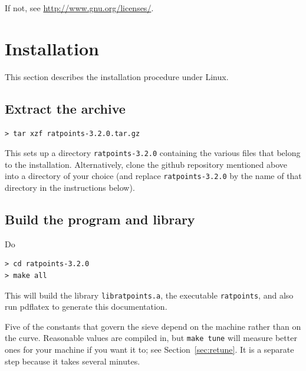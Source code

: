 \documentclass[12pt,a4paper,oneside]{amsart}
\newcommand{\rpversion}{3.2.0} %
\begin{document}
If not, see \url{http://www.gnu.org/licenses/}.


\section{Installation}

This section describes the installation procedure under Linux.

\subsection{Extract the archive}

\begin{verbatim}
> tar xzf ratpoints-3.2.0.tar.gz
\end{verbatim}

This sets up a directory \texttt{ratpoints-\rpversion} containing the various
files that belong to the installation. Alternatively, clone the github
repository mentioned above into a directory of your choice (and replace
\texttt{ratpoints-\rpversion} by the name of that directory in the instructions below).

\subsection{Build the program and library}\label{sec:build}

Do

\begin{verbatim}
> cd ratpoints-3.2.0
> make all
\end{verbatim}

This will build the library \texttt{libratpoints.a}, the executable
\texttt{ratpoints}, and also run pdf\/latex to generate this documentation.

Five of the constants that govern the sieve depend on the machine rather than
on the curve. Reasonable values are compiled in, but \texttt{make tune} will
measure better ones for your machine if you want it to; see
Section~\ref{sec:retune}. It is a separate step because it takes several
minutes.
\end{document}
